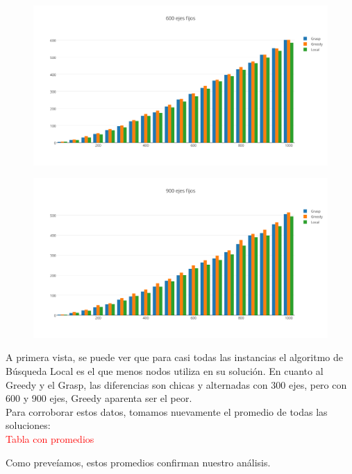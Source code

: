    \begin{figure}[h!]
   \begin{center}
 	\includegraphics[scale=0.7]{imagenes/6/600EjesFijos.png}
   \end{center}
 \end{figure}

   \begin{figure}[h!]
   \begin{center}
 	\includegraphics[scale=0.7]{imagenes/6/900EjesFijos.png}
   \end{center}
 \end{figure}
 
A primera vista, se puede ver que para casi todas las instancias el algoritmo de B\'usqueda Local es el que menos nodos utiliza en su soluci\'on. 
En cuanto al Greedy y el Grasp, las diferencias son chicas y alternadas con 300 ejes, pero con 600 y 900 ejes, Greedy aparenta ser el peor.\\

Para corroborar estos datos, tomamos nuevamente el promedio de todas las soluciones:\\

\textcolor{red}{Tabla con promedios}

Como preve\'iamos, estos promedios confirman nuestro an\'alisis.